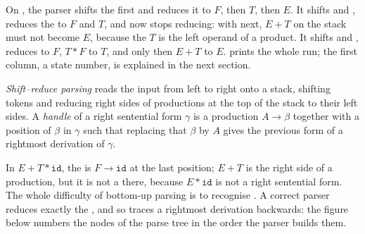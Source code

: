 On , the parser shifts the first  and reduces it to $F$, then $T$, then $E$. It shifts \code{+} and , reduces the  to $F$ and $T$, and now stops reducing: with \code{*} next, $E + T$ on the stack must not become $E$, because the $T$ is the left operand of a product. It shifts \code{*} and , reduces  to $F$, $T * F$ to $T$, and only then $E + T$ to $E$.  prints the whole run; the first column, a state number, is explained in the next section.

\label{out:b3:bottom-up-parsing:trace}

\begin{definition}\label{def:b3:bottom-up-parsing:shift-reduce}
\emph{Shift--reduce parsing} reads the input from left to right onto a stack, shifting tokens and reducing right sides of productions at the top of the stack to their left sides. A \emph{handle} of a right sentential form $\gamma$ is a production $A \to \beta$ together with a position of $\beta$ in $\gamma$ such that replacing that $\beta$ by $A$ gives the previous form of a rightmost derivation of $\gamma$.
\end{definition}

In $E + T * \mathtt{id}$, the  is $F \to \mathtt{id}$ at the last position; $E + T$ is the right side of a production, but it is not a  there, because $E * \mathtt{id}$ is not a right sentential form. The whole difficulty of bottom-up parsing is to recognise . A correct parser reduces exactly the , and so traces a rightmost derivation backwards: the figure below numbers the nodes of the parse tree in the order the parser builds them.


